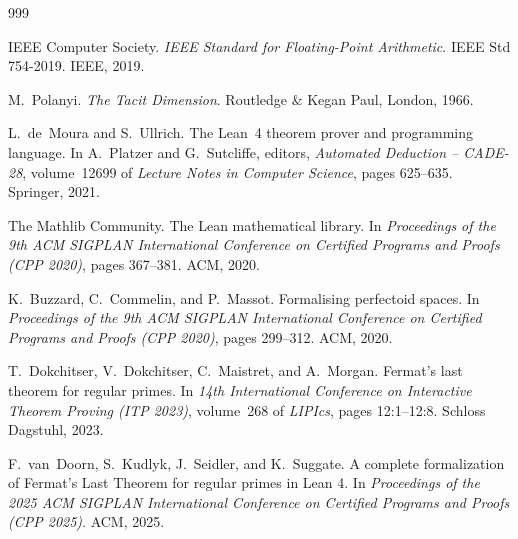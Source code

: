 \begin{thebibliography}{999}

IEEE Computer Society.
\newblock \emph{{IEEE Standard for Floating-Point Arithmetic}}.
\newblock IEEE Std 754-2019. IEEE, 2019.


M.~Polanyi.
\newblock \emph{The Tacit Dimension}.
\newblock Routledge \& Kegan Paul, London, 1966.


L.~de~Moura and S.~Ullrich.
\newblock The {Lean}~4 theorem prover and programming language.
\newblock In A.~Platzer and G.~Sutcliffe, editors,
  \emph{Automated Deduction -- CADE-28},
  volume~12699 of \emph{Lecture Notes in Computer Science},
  pages 625--635. Springer, 2021.

{The Mathlib Community}.
\newblock The {Lean} mathematical library.
\newblock In \emph{Proceedings of the 9th ACM SIGPLAN International Conference
  on Certified Programs and Proofs (CPP 2020)},
  pages 367--381. ACM, 2020.


K.~Buzzard, C.~Commelin, and P.~Massot.
\newblock Formalising perfectoid spaces.
\newblock In \emph{Proceedings of the 9th ACM SIGPLAN International Conference
  on Certified Programs and Proofs (CPP 2020)}, pages 299--312. ACM, 2020.

T.~Dokchitser, V.~Dokchitser, C.~Maistret, and A.~Morgan.
\newblock Fermat's last theorem for regular primes.
\newblock In \emph{14th International Conference on Interactive Theorem
  Proving (ITP 2023)}, volume~268 of \emph{LIPIcs}, pages 12:1--12:8. Schloss
  Dagstuhl, 2023.

F.~van~Doorn, S.~Kudlyk, J.~Seidler, and K.~Suggate.
\newblock A complete formalization of {Fermat's Last Theorem} for regular
  primes in {Lean 4}.
\newblock In \emph{Proceedings of the 2025 ACM SIGPLAN International Conference
  on Certified Programs and Proofs (CPP 2025)}. ACM, 2025.

\end{thebibliography}
